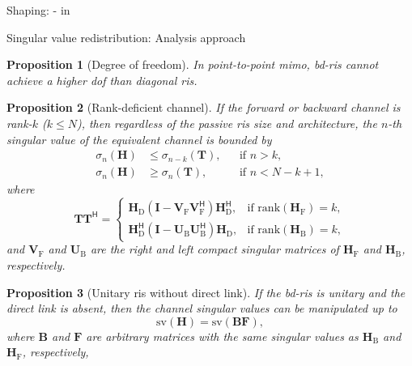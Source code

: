 \documentclass[presentation,xcolor={table},9pt]{beamer}
\newtheorem{proposition}{Proposition}
\begin{document}
\begin{section}{Shaping: - in }
	\begin{frame}{Singular value redistribution: Analysis approach}
		\fontsize{6pt}{7.2}\selectfont
		\begin{proposition}[Degree of freedom]\label{pp:dof}
			In point-to-point \gls{mimo}, \gls{bd}-\gls{ris} cannot achieve a higher \gls{dof} than diagonal \gls{ris}.
		\end{proposition}
		\begin{proposition}[Rank-deficient channel]\label{pp:rank_deficient}
			If the forward or backward channel is rank-$k$ ($k \le N$), then regardless of the passive \gls{ris} size and architecture, the $n$-th singular value of the equivalent channel is bounded by
			\begin{align*}
				\sigma_n(\mathbf{H}) & \le \sigma_{n-k}(\mathbf{T}), &  & \text{if } n > k,         \\
				\sigma_n(\mathbf{H}) & \ge \sigma_n(\mathbf{T}),     &  & \text{if } n < N - k + 1,
			\end{align*}
			where
			\begin{equation*}
				\mathbf{T} \mathbf{T}^\mathsf{H} =
				\begin{cases}
					\mathbf{H}_\mathrm{D} (\mathbf{I} - \mathbf{V}_\mathrm{F} \mathbf{V}_\mathrm{F}^\mathsf{H}) \mathbf{H}_\mathrm{D}^\mathsf{H}, & \text{if } \mathrm{rank}(\mathbf{H}_\mathrm{F}) = k, \\
					\mathbf{H}_\mathrm{D}^\mathsf{H} (\mathbf{I} - \mathbf{U}_\mathrm{B} \mathbf{U}_\mathrm{B}^\mathsf{H}) \mathbf{H}_\mathrm{D}, & \text{if } \mathrm{rank}(\mathbf{H}_\mathrm{B}) = k,
				\end{cases}
				\label{eq:auxiliary_matrix}
			\end{equation*}
			and $\mathbf{V}_\mathrm{F}$ and $\mathbf{U}_\mathrm{B}$ are the right and left compact singular matrices of $\mathbf{H}_\mathrm{F}$ and $\mathbf{H}_\mathrm{B}$, respectively.
		\end{proposition}
		\begin{proposition}[Unitary \gls{ris} without direct link]\label{pp:fully_connected}
			If the \gls{bd}-\gls{ris} is unitary and the direct link is absent, then the channel singular values can be manipulated up to
			\begin{equation*}
				\mathrm{sv}(\mathbf{H}) = \mathrm{sv}(\mathbf{BF}),
			\end{equation*}
			where $\mathbf{B}$ and $\mathbf{F}$ are arbitrary matrices with the same singular values as $\mathbf{H}_\mathrm{B}$ and $\mathbf{H}_\mathrm{F}$, respectively,
		\end{proposition}
	\end{frame}


\end{section}
\end{document}
